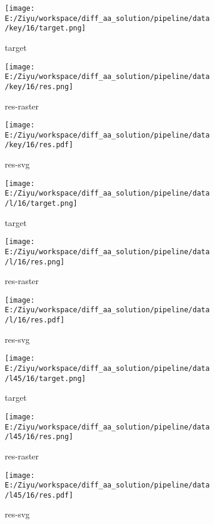 \documentclass{article}%
\begin{document}
%


\begin{figure}[H]%
\begin{subfigure}[b]{0.32\linewidth}%
\texttt{[image: E:/Ziyu/workspace/diff\_aa\_solution/pipeline/data/key/16/target.png]}%
\caption{target}%
\end{subfigure}%
\begin{subfigure}[b]{0.32\linewidth}%
\texttt{[image: E:/Ziyu/workspace/diff\_aa\_solution/pipeline/data/key/16/res.png]}%
\caption{res{-}raster}%
\end{subfigure}%
\begin{subfigure}[b]{0.32\linewidth}%
\texttt{[image: E:/Ziyu/workspace/diff\_aa\_solution/pipeline/data/key/16/res.pdf]}%
\caption{res{-}svg}%
\end{subfigure}%
\par\vspace{1em}%
\caption{}%
\clearpage%
\end{figure}

%


\begin{figure}[H]%
\begin{subfigure}[b]{0.32\linewidth}%
\texttt{[image: E:/Ziyu/workspace/diff\_aa\_solution/pipeline/data/l/16/target.png]}%
\caption{target}%
\end{subfigure}%
\begin{subfigure}[b]{0.32\linewidth}%
\texttt{[image: E:/Ziyu/workspace/diff\_aa\_solution/pipeline/data/l/16/res.png]}%
\caption{res{-}raster}%
\end{subfigure}%
\begin{subfigure}[b]{0.32\linewidth}%
\texttt{[image: E:/Ziyu/workspace/diff\_aa\_solution/pipeline/data/l/16/res.pdf]}%
\caption{res{-}svg}%
\end{subfigure}%
\par\vspace{1em}%
\caption{}%
\end{figure}

%


\begin{figure}[H]%
\begin{subfigure}[b]{0.32\linewidth}%
\texttt{[image: E:/Ziyu/workspace/diff\_aa\_solution/pipeline/data/l45/16/target.png]}%
\caption{target}%
\end{subfigure}%
\begin{subfigure}[b]{0.32\linewidth}%
\texttt{[image: E:/Ziyu/workspace/diff\_aa\_solution/pipeline/data/l45/16/res.png]}%
\caption{res{-}raster}%
\end{subfigure}%
\begin{subfigure}[b]{0.32\linewidth}%
\texttt{[image: E:/Ziyu/workspace/diff\_aa\_solution/pipeline/data/l45/16/res.pdf]}%
\caption{res{-}svg}%
\end{subfigure}%
\par\vspace{1em}%
\caption{}%
\end{figure}
\end{document}
